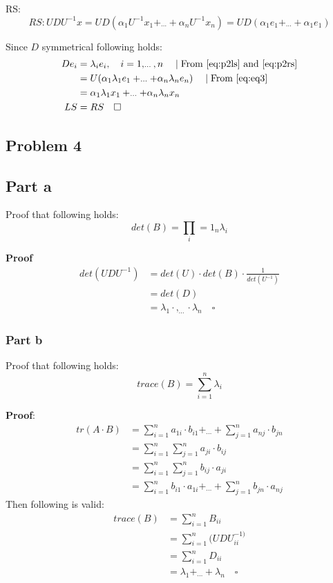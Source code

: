 RS:\begin{equation}\label{eq:p2rs}
RS:	UDU^{-1}x=UD(\alpha_{1}U^{-1}x_{1}+_{\cdots}+\alpha_{n}U^{-1}x_{n})=UD(\alpha_{1}e_{1}+_{\cdots}+\alpha_{1}e_{1})
\end{equation}

Since $D$ symmetrical following holds:
\begin{align*}
De_{i}	&=\lambda_{i}e_{i},\quad i=1,_{\cdots},n\quad\mid \text{From \ref{eq:p2ls} and \ref{eq:p2rs}}\\
		&=U(\alpha_{1}\lambda_{1} e_{1}+_{\cdots}+\alpha_{n}\lambda_{n} e_{n})\quad\mid \text{From \ref{eq:eq3}}\\
		&=\alpha_{1}\lambda_{1} x_{1}+_{\cdots}+\alpha_{n}\lambda_{n} x_{n}\\
	LS	&= RS\quad\square
\end{align*}

\subsection*{Problem 4}
\subsection*{Part a}
Proof that following holds:
\begin{equation*}
det(B)=\prod_i=1_{n}\lambda_{i}
\end{equation*}

\textbf{Proof}
\begin{align}
det(UDU^{-1})	&=det(U)\cdot det(B)\cdot \frac{1}{det(U^{-1})}\\
				&=det(D)\\
				&=\lambda_{1}\cdot,_{\cdots}\cdot \lambda_{n}\quad\square
\end{align}

\subsubsection*{Part b}
Proof that following holds:
\begin{equation*}
trace(B)=\sum_{i=1}^{n}\lambda_{i}
\end{equation*}

\textbf{Proof}:
\begin{align*}
tr(A\cdot B)&=\sum_{i=1}^{n}a_{1i}\cdot b_{i1}+_{\cdots}+\sum_{j=1}^{n}a_{nj}\cdot b_{jn}\\
			&=\sum_{i=1}^{n}\sum_{j=1}^{n}a_{ji}\cdot b_{ij}\\
			&=\sum_{i=1}^{n}\sum_{j=1}^{n} b_{ij}\cdot a_{ji}\\
			&=\sum_{i=1}^{n}b_{i1}\cdot a_{1i}+_{\cdots}+\sum_{j=1}^{n}b_{jn}\cdot a_{nj}
\end{align*}
Then following is valid:
\begin{align*}
trace(B)	&=\sum_{i=1}^{n}B_{ii}\\
			&=\sum_{i=1}^{n}(UDU^{-1)}_{ii}\\
			&=\sum_{i=1}^{n}D_{ii}\\
			&=\lambda_{1}+_{\cdots}+\lambda_{n}\quad\square
\end{align*}

